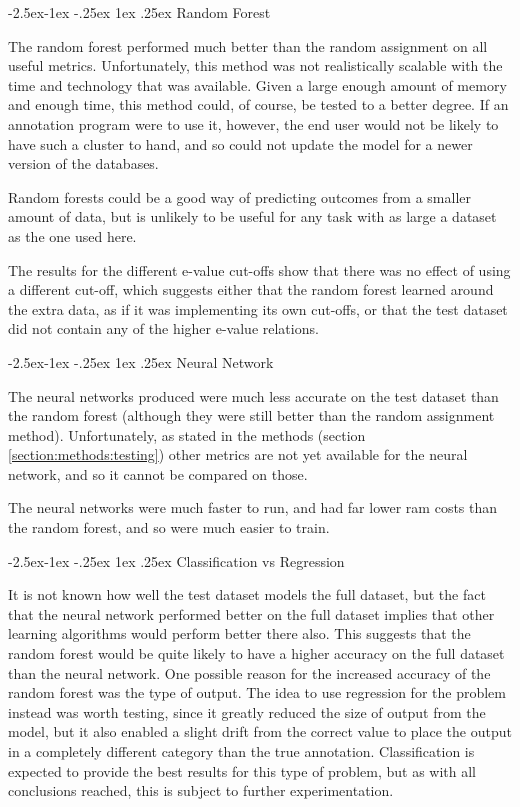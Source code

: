 \documentclass[12pt]{article}
\makeatletter
\renewcommand\subsubsection{\@startsection{subsubsection}{4}{\z@}
            {-2.5ex\@plus -1ex \@minus -.25ex}
            {1ex \@plus .25ex}
            {\normalfont\large\bfseries}}
\renewcommand\subsection{\@startsection{subsection}{4}{\z@}
            {-2.5ex\@plus -1ex \@minus -.25ex}
            {1ex \@plus .25ex}
            {\normalfont\Large\bfseries}}
\makeatother
\begin{document}
			\subsubsection{Random Forest}
			
			The random forest performed much better than the random assignment on all useful metrics.  Unfortunately, this method was not realistically scalable with the time and technology that was available.  Given a large enough amount of memory and enough time, this method could, of course, be tested to a better degree.  If an annotation program were to use it, however, the end user would not be likely to have such a cluster to hand, and so could not update the model for a newer version of the databases.
			
			Random forests could be a good way of predicting outcomes from a smaller amount of data, but is unlikely to be useful for any task with as large a dataset as the one used here.
			
			The results for the different e-value cut-offs show that there was no effect of using a different cut-off, which suggests either that the random forest learned around the extra data, as if it was implementing its own cut-offs, or that the test dataset did not contain any of the higher e-value relations.
			
			\subsubsection{Neural Network}
			
			The neural networks produced were much less accurate on the test dataset than the random forest (although they were still better than the random assignment method).  Unfortunately, as stated in the methods (section \ref{section:methods:testing}) other metrics are not yet available for the neural network, and so it cannot be compared on those.
			
			The neural networks were much faster to run, and had far lower ram costs than the random forest, and so were much easier to train.
			
		\subsection{Classification vs Regression}

		It is not known how well the test dataset models the full dataset, but the fact that the neural network performed better on the full dataset implies that other learning algorithms would perform better there also.  This suggests that the random forest would be quite likely to have a higher accuracy on the full dataset than the neural network.  One possible reason for the increased accuracy of the random forest was the type of output.  The idea to use regression for the problem instead was worth testing, since it greatly reduced the size of output from the model, but it also enabled a slight drift from the correct value to place the output in a completely different category than the true annotation. Classification is expected to provide the best results for this type of problem, but as with all conclusions reached, this is subject to further experimentation.
		
\end{document}
